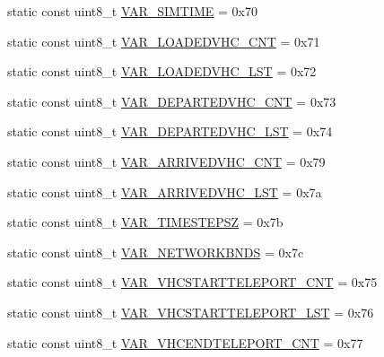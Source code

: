 \begin{DoxyCompactItemize}
\item 
static const uint8\+\_\+t \hyperlink{classtraci__api_1_1_simulation_ad85a2daa3b6e62afebf23c63aa54c5a7}{V\+A\+R\+\_\+\+S\+I\+M\+T\+I\+ME} = 0x70
\item 
static const uint8\+\_\+t \hyperlink{classtraci__api_1_1_simulation_a0c320b73a88c6bd0d5d15b9b7d8ca079}{V\+A\+R\+\_\+\+L\+O\+A\+D\+E\+D\+V\+H\+C\+\_\+\+C\+NT} = 0x71
\item 
static const uint8\+\_\+t \hyperlink{classtraci__api_1_1_simulation_aef180578795a463be2e4b4d47674f07e}{V\+A\+R\+\_\+\+L\+O\+A\+D\+E\+D\+V\+H\+C\+\_\+\+L\+ST} = 0x72
\item 
static const uint8\+\_\+t \hyperlink{classtraci__api_1_1_simulation_a2211a9befd772188a83012e61d0bf890}{V\+A\+R\+\_\+\+D\+E\+P\+A\+R\+T\+E\+D\+V\+H\+C\+\_\+\+C\+NT} = 0x73
\item 
static const uint8\+\_\+t \hyperlink{classtraci__api_1_1_simulation_a4e5cf74cd62df38b5e0a4e750983c6e1}{V\+A\+R\+\_\+\+D\+E\+P\+A\+R\+T\+E\+D\+V\+H\+C\+\_\+\+L\+ST} = 0x74
\item 
static const uint8\+\_\+t \hyperlink{classtraci__api_1_1_simulation_aa2763aba4aa46ba82dc9b1f258101ca4}{V\+A\+R\+\_\+\+A\+R\+R\+I\+V\+E\+D\+V\+H\+C\+\_\+\+C\+NT} = 0x79
\item 
static const uint8\+\_\+t \hyperlink{classtraci__api_1_1_simulation_ae7a55aa19afe46dd3e54ed60ccc736bf}{V\+A\+R\+\_\+\+A\+R\+R\+I\+V\+E\+D\+V\+H\+C\+\_\+\+L\+ST} = 0x7a
\item 
static const uint8\+\_\+t \hyperlink{classtraci__api_1_1_simulation_a32191847f48857d89c02e27c7134e862}{V\+A\+R\+\_\+\+T\+I\+M\+E\+S\+T\+E\+P\+SZ} = 0x7b
\item 
static const uint8\+\_\+t \hyperlink{classtraci__api_1_1_simulation_aae0a592bee89106e697c1eb2bb312b74}{V\+A\+R\+\_\+\+N\+E\+T\+W\+O\+R\+K\+B\+N\+DS} = 0x7c
\item 
static const uint8\+\_\+t \hyperlink{classtraci__api_1_1_simulation_ad9ea6052e8bbce54c86cccd34d949859}{V\+A\+R\+\_\+\+V\+H\+C\+S\+T\+A\+R\+T\+T\+E\+L\+E\+P\+O\+R\+T\+\_\+\+C\+NT} = 0x75
\item 
static const uint8\+\_\+t \hyperlink{classtraci__api_1_1_simulation_a143172fa14c4207f49e634c7b2624627}{V\+A\+R\+\_\+\+V\+H\+C\+S\+T\+A\+R\+T\+T\+E\+L\+E\+P\+O\+R\+T\+\_\+\+L\+ST} = 0x76
\item 
static const uint8\+\_\+t \hyperlink{classtraci__api_1_1_simulation_a005529f94d02779594428533d622b5bd}{V\+A\+R\+\_\+\+V\+H\+C\+E\+N\+D\+T\+E\+L\+E\+P\+O\+R\+T\+\_\+\+C\+NT} = 0x77

\end{DoxyCompactItemize}
